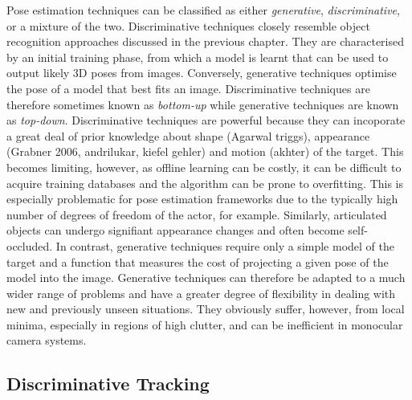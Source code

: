 Pose estimation techniques can be classified as either \textit{generative}, \textit{discriminative}, or a mixture of the two. Discriminative techniques closely resemble object recognition approaches discussed in the previous chapter. They are characterised by an initial training phase, from which a model is learnt that can be used to output likely 3D poses from images. Conversely, generative techniques optimise the pose of a model that best fits an image. Discriminative techniques are therefore sometimes known as \textit{bottom-up} while generative techniques are known as \textit{top-down}. Discriminative techniques are powerful because they can incoporate a great deal of prior knowledge about shape (Agarwal triggs), appearance (Grabner 2006, andrilukar, kiefel gehler) and motion (akhter) of the target. This becomes limiting, however, as offline learning can be costly, it can be difficult to acquire training databases and the algorithm can be prone to overfitting. This is especially problematic for pose estimation frameworks due to the typically high number of degrees of freedom of the actor, for example. Similarly, articulated objects can undergo signifiant appearance changes and often become self-occluded. In contrast, generative techniques require only a simple model of the target and a function that measures the cost of projecting a given pose of the model into the image. Generative techniques can therefore be adapted to a much wider range of problems and have a greater degree of flexibility in dealing with new and previously unseen situations. They obviously suffer, however, from local minima, especially in regions of high clutter, and can be inefficient in monocular camera systems. 


\subsection{Discriminative Tracking}

